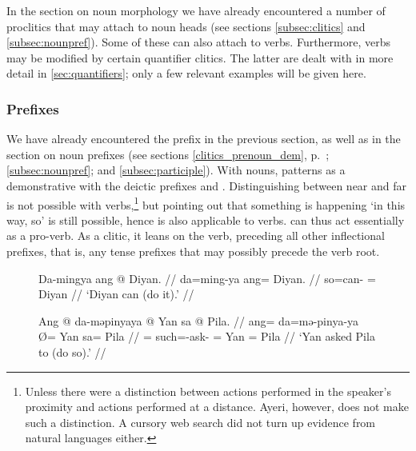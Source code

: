 In the section on noun morphology we have already encountered a number of
proclitics that may attach to noun heads (see sections
\ref{subsec:clitics} and \ref{subsec:nounpref}). Some of these can also attach
to verbs. Furthermore, verbs may be modified by certain quantifier clitics. The
latter are dealt with in more detail in \autoref{sec:quantifiers}; only a few
relevant examples will be given here.

\subsubsection{Prefixes}
\label{subsubsec:verbprefixes}

We have already encountered the prefix  in the
previous section, as well as in the section on noun prefixes (see sections
\ref{clitics_prenoun_dem}, p.~\pageref{clitics_prenoun_dem}; 
\ref{subsec:nounpref}; and \ref{subsec:participle}). With nouns,
 patterns as a demonstrative with the deictic prefixes
 and . Distinguishing between near
and far is not possible with verbs,\footnote{Unless there were a distinction
between actions performed in the speaker's proximity and actions performed at a
distance. Ayeri, however, does not make such a distinction. A cursory web
search did not turn up evidence from natural languages either.} but pointing
out that something is happening `in this way, so' is still possible, hence
 is also applicable to verbs.  can thus act
essentially as a pro-verb. As a clitic, it leans on the verb, preceding all
other inflectional prefixes, that is, any tense prefixes that may possibly
precede the verb root.

\begin{figure}[h]
\pex\label{ex:daproverb}
\a\begingl
	\gla Da-mingya ang @ Diyan. //
	\glb da=ming-ya ang= Diyan. //
	\glc so=can-\TsgM{} \Aarg{}= Diyan //
	\glft `Diyan can (do it).' //
\endgl

\a\begingl
	\gla Ang @ da-məpinyaya {} @ Yan sa @ Pila. //
	\glb ang= da=mə-pinya-ya Ø= Yan sa= Pila //
	\glc \AgtT{}= such=\Pst{}-ask-\TsgM{} \Top{}= Yan \Parg{}= Pila //
	\glft `Yan asked Pila to (do so).' //
\endgl
\xe
\end{figure}

